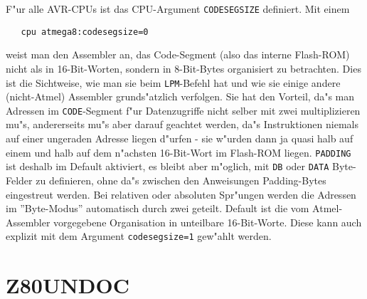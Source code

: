 \documentclass[12pt,a4paper,twoside]{report}
\begin{document}
F"ur alle AVR-CPUs ist das CPU-Argument {\tt CODESEGSIZE} definiert.
Mit einem
\begin{verbatim}
   cpu atmega8:codesegsize=0
\end{verbatim}
weist man den Assembler an, das Code-Segment (also das interne Flash-ROM)
nicht als in 16-Bit-Worten, sondern in 8-Bit-Bytes organisiert zu betrachten.
Dies ist die Sichtweise, wie man sie beim {\tt LPM}-Befehl hat und wie sie
einige andere (nicht-Atmel) Assembler grunds"atzlich verfolgen.  Sie hat den
Vorteil, da"s man Adressen im {\tt CODE}-Segment f"ur Datenzugriffe nicht selber
mit zwei multiplizieren mu"s, andererseits mu"s aber darauf geachtet werden,
da"s Instruktionen niemals auf einer ungeraden Adresse liegen d"urfen - sie
w"urden dann ja quasi halb auf einem und halb auf dem n"achsten 16-Bit-Wort
im Flash-ROM liegen.  {\tt PADDING} ist deshalb im Default aktiviert, es bleibt
aber m"oglich, mit {\tt DB} oder {\tt DATA} Byte-Felder zu definieren, ohne
da"s zwischen den Anweisungen Padding-Bytes eingestreut werden.  Bei relativen
oder absoluten Spr"ungen werden die Adressen im ''Byte-Modus'' automatisch
durch zwei geteilt.  Default ist die vom Atmel-Assembler vorgegebene Organisation
in unteilbare 16-Bit-Worte.  Diese kann auch explizit mit dem Argument
\verb!codesegsize=1! gew"ahlt werden.


\section{Z80UNDOC}
\end{document}
